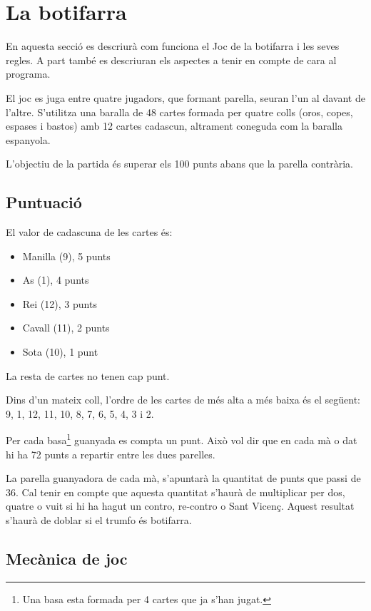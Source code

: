 \chapter{La botifarra}
\label{chap:botifarra}

En aquesta secció es descriurà com funciona el Joc de la botifarra i les seves regles. A part també es descriuran els aspectes a tenir en compte de cara al programa. 


El joc es juga entre quatre jugadors, que formant parella, seuran l'un al davant de l'altre. S'utilitza una baralla de 48 cartes formada per quatre colls (oros, copes, espases i bastos) amb 12 cartes cadascun, altrament coneguda com la baralla espanyola.


L'objectiu de la partida és superar els 100 punts abans que la parella contrària. 


\section{Puntuació}

El valor de cadascuna de les cartes és:
\begin{itemize}
	\item{Manilla (9), 5 punts}
    \item{As (1), 4 punts}
    \item{Rei (12), 3 punts}
    \item{Cavall (11), 2 punts}
    \item{Sota (10), 1 punt}
\end{itemize}

La resta de cartes no tenen cap punt.
    
Dins d'un mateix coll, l'ordre de les cartes de més alta a més baixa és el següent: 9, 1, 12, 11, 10, 8, 7, 6, 5, 4, 3 i 2.

Per cada basa\footnote{Una basa esta formada per 4 cartes que ja s'han jugat.} guanyada es compta un punt. Això vol dir que en cada mà o dat hi ha 72 punts a repartir entre les dues parelles.

La parella guanyadora de cada mà, s'apuntarà la quantitat de punts que passi de 36. Cal tenir en compte que aquesta quantitat s'haurà de multiplicar per dos, quatre o vuit si hi ha hagut un contro, re-contro o Sant Vicenç. Aquest resultat s'haurà de doblar si el trumfo és botifarra.

\section{Mecànica de joc}

